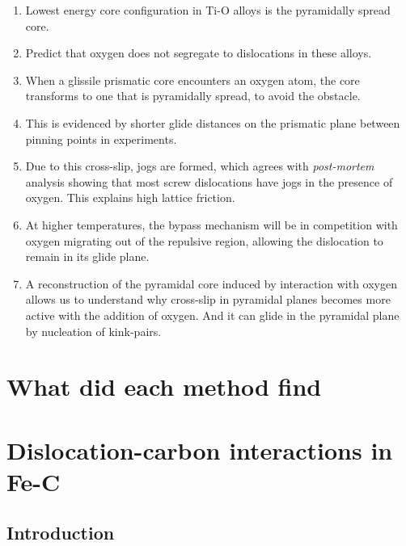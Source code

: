 \documentclass[a4paper,12pt,oneside,print,numbered,index,PageStyleIII]{PhDThesisPSnPDF}
\begin{document}
\begin{enumerate}
\item Lowest energy core configuration in Ti-O alloys is the
pyramidally spread core.
\item Predict that oxygen does not segregate to dislocations in these
alloys.
\item When a glissile prismatic core encounters an oxygen atom, the
core transforms to one that is pyramidally spread, to avoid the
obstacle.
\item This is evidenced by shorter glide distances on the prismatic
plane between pinning points in experiments.
\item Due to this cross-slip, jogs are formed, which agrees with
\emph{post-mortem} analysis showing that most screw dislocations have
jogs in the presence of oxygen. This explains high lattice
friction.
\item At higher temperatures, the bypass mechanism will be in
competition with oxygen migrating out of the repulsive region,
allowing the dislocation to remain in its glide plane.
\item A reconstruction of the pyramidal core induced by interaction
with oxygen allows us to understand why cross-slip in pyramidal
planes becomes more active with the addition of oxygen. And it
can glide in the pyramidal plane by nucleation of kink-pairs.
\end{enumerate}








\chapter{What did each method find}
\label{sec:org1064e93}

\chapter{}
\label{sec:orgf7bf406}

\chapter{Dislocation-carbon interactions in Fe-C}
\label{sec:orge53f932}
\label{chapter:dislocation_carbon_FeC}

\section{Introduction}
\label{sec:orgba0bc6d}
\end{document}
